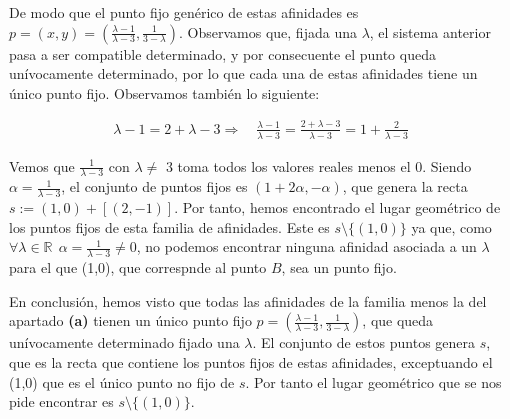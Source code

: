 De modo que el punto fijo genérico de estas afinidades es $p = (x,y) = (\frac{\lambda - 1}{\lambda - 3}, \frac{1}{3 - \lambda})$. Observamos que, fijada una $\lambda$, el sistema anterior pasa a ser compatible determinado, y por consecuente el punto queda unívocamente determinado, por lo que cada una de estas afinidades tiene un único punto fijo. Observamos también lo siguiente:

\begin{gather*}
    \lambda - 1 = 2 + \lambda - 3 \Longrightarrow \quad \frac{\lambda - 1}{\lambda - 3}= \frac{2+\lambda-3}{\lambda-3} = 1 + \frac{2}{\lambda - 3}
\end{gather*}

Vemos que $\frac{1}{\lambda - 3}$ con $\lambda \neq$ 3 toma todos los valores reales menos el 0. Siendo $\alpha = \frac{1}{\lambda - 3}$, el conjunto de puntos fijos es $(1 + 2\alpha, -\alpha)$, que genera la recta $s := (1,0)+ [(2,-1)]$. Por tanto, hemos encontrado el lugar geométrico de los puntos fijos de  esta familia de afinidades. Este es $s\setminus\{(1,0)\}$ ya que, como $\forall \lambda \in \mathbb{R} \ \ \alpha = \frac{1}{\lambda - 3} \neq 0$, no podemos encontrar ninguna afinidad asociada a un $\lambda$ para el que (1,0), que correspnde al punto $B$, sea un punto fijo.

En conclusión, hemos visto que todas las afinidades de la familia menos la del apartado \textbf{(a)} tienen un único punto fijo $p = (\frac{\lambda - 1}{\lambda - 3}, \frac{1}{3 - \lambda})$, que queda unívocamente determinado fijado una $\lambda$. El conjunto de estos puntos genera $s$, que es la recta que contiene los puntos fijos de estas afinidades, exceptuando el (1,0) que es el único punto no fijo de $s$. Por tanto el lugar geométrico que se nos pide encontrar es $s\setminus\{(1,0)\}$.